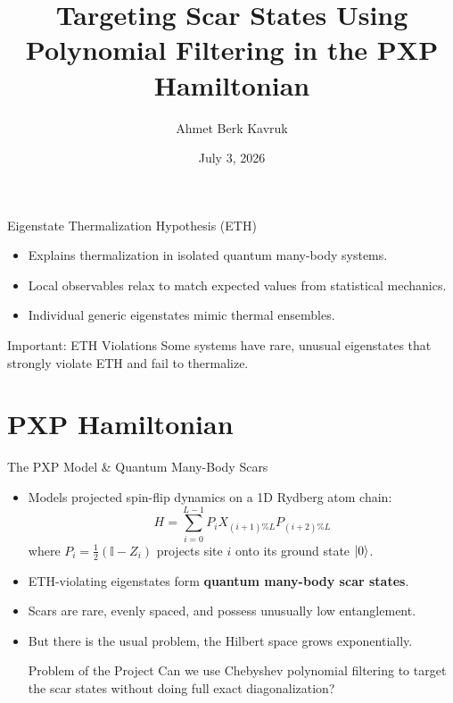 \documentclass[aspectratio=169]{beamer}
\title[PXP Polynomial Filtering]
{Targeting Scar States Using Polynomial Filtering in the PXP Hamiltonian}
\author{Ahmet Berk Kavruk}
\date{July 3, 2026}
\begin{document}
\begin{frame}
    \titlepage
\end{frame}

\begin{frame}{Eigenstate Thermalization Hypothesis (ETH)}
    \begin{itemize}
        \item Explains thermalization in isolated quantum many-body systems.
        \item Local observables relax to match expected values from statistical mechanics.
        \item Individual generic eigenstates mimic thermal ensembles.
    \end{itemize}
    \vfill
    \begin{block}{Important: ETH Violations}
        Some systems have rare, unusual eigenstates that strongly violate ETH and fail to thermalize.
    \end{block}
\end{frame}

\section{PXP Hamiltonian}

\begin{frame}{The PXP Model \& Quantum Many-Body Scars}
    \begin{itemize}
        \item Models projected spin-flip dynamics on a 1D Rydberg atom chain:
        \begin{equation}
            H = \sum_{i=0}^{L-1} P_{i} X_{(i+1)\%L} P_{(i+2)\%L}
        \end{equation}
        where $P_i = \frac{1}{2}(\mathbb{I} - Z_i)$ projects site $i$ onto its ground state $\ket{0}$.
        \item ETH-violating eigenstates form \textbf{quantum many-body scar states}.
        \item Scars are rare, evenly spaced, and possess unusually low entanglement.
        \item But there is the usual problem, the Hilbert space grows exponentially.

        \begin{block}{Problem of the Project}
            Can we use Chebyshev polynomial filtering to target the scar states without doing full exact diagonalization?
        \end{block}
    \end{itemize}
\end{frame}
\end{document}
